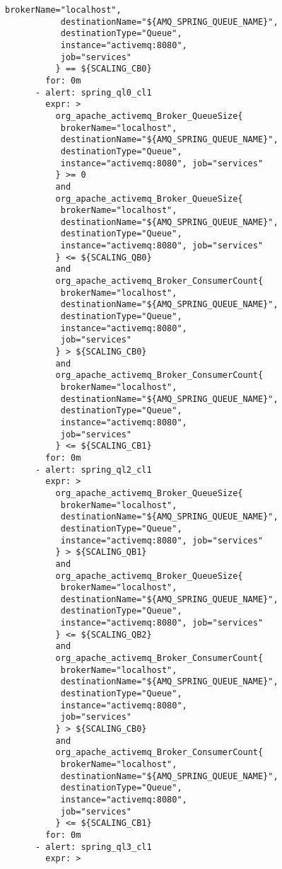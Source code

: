 \begin{lstlisting}[style=bashStyle,caption={alert-unparsed.yml},label=lst:alert-unparsed]
           brokerName="localhost",
           destinationName="${AMQ_SPRING_QUEUE_NAME}", 
           destinationType="Queue",
           instance="activemq:8080", 
           job="services"
          } == ${SCALING_CB0}
        for: 0m
      - alert: spring_ql0_cl1
        expr: >
          org_apache_activemq_Broker_QueueSize{
           brokerName="localhost", 
           destinationName="${AMQ_SPRING_QUEUE_NAME}",
           destinationType="Queue", 
           instance="activemq:8080", job="services"
          } >= 0
          and 
          org_apache_activemq_Broker_QueueSize{
           brokerName="localhost", 
           destinationName="${AMQ_SPRING_QUEUE_NAME}",
           destinationType="Queue", 
           instance="activemq:8080", job="services"
          } <= ${SCALING_QB0}
          and 
          org_apache_activemq_Broker_ConsumerCount{
           brokerName="localhost",
           destinationName="${AMQ_SPRING_QUEUE_NAME}", 
           destinationType="Queue",
           instance="activemq:8080", 
           job="services"
          } > ${SCALING_CB0}
          and
          org_apache_activemq_Broker_ConsumerCount{
           brokerName="localhost",
           destinationName="${AMQ_SPRING_QUEUE_NAME}", 
           destinationType="Queue",
           instance="activemq:8080", 
           job="services"
          } <= ${SCALING_CB1}
        for: 0m
      - alert: spring_ql2_cl1
        expr: >
          org_apache_activemq_Broker_QueueSize{
           brokerName="localhost", 
           destinationName="${AMQ_SPRING_QUEUE_NAME}",
           destinationType="Queue", 
           instance="activemq:8080", job="services"
          } > ${SCALING_QB1}
          and 
          org_apache_activemq_Broker_QueueSize{
           brokerName="localhost", 
           destinationName="${AMQ_SPRING_QUEUE_NAME}",
           destinationType="Queue", 
           instance="activemq:8080", job="services"
          } <= ${SCALING_QB2}
          and 
          org_apache_activemq_Broker_ConsumerCount{
           brokerName="localhost",
           destinationName="${AMQ_SPRING_QUEUE_NAME}", 
           destinationType="Queue",
           instance="activemq:8080", 
           job="services"
          } > ${SCALING_CB0}
          and
          org_apache_activemq_Broker_ConsumerCount{
           brokerName="localhost",
           destinationName="${AMQ_SPRING_QUEUE_NAME}", 
           destinationType="Queue",
           instance="activemq:8080", 
           job="services"
          } <= ${SCALING_CB1}
        for: 0m
      - alert: spring_ql3_cl1
        expr: >

\end{lstlisting}
